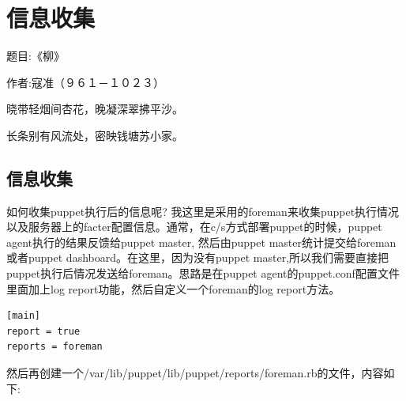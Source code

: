 \chapter{\msyh 信息收集}
\begin{center}
\kai
题目:《柳》\par
作者:寇准（９６１－１０２３）\par
晓带轻烟间杏花，晚凝深翠拂平沙。\par
长条别有风流处，密映钱塘苏小家。 \par

\end{center}

\fzsk 
\section{\msyh  信息收集}

如何收集puppet执行后的信息呢? 我这里是采用的foreman来收集puppet执行情况以及服务器上的facter配置信息。通常，在c/s方式部署puppet的时候，puppet agent执行的结果反馈给puppet master, 然后由puppet master统计提交给foreman或者puppet dashboard。在这里，因为没有puppet master,所以我们需要直接把puppet执行后情况发送给foreman。思路是在puppet agent的puppet.conf配置文件里面加上log report功能，然后自定义一个foreman的log report方法。

\codefont\tiny \begin{lstlisting}
[main]
report = true
reports = foreman

\end{lstlisting}

\fzsk\normalsize

然后再创建一个/var/lib/puppet/lib/puppet/reports/foreman.rb的文件，内容如下:

